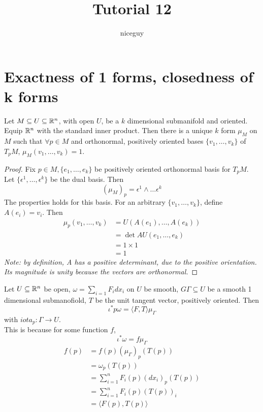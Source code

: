 \documentclass[12pt]{article}
\title{Tutorial 12}
\author{niceguy}
\begin{document}
\maketitle

\section{Exactness of 1 forms, closedness of k forms}

\begin{lem}
    Let $M \subseteq U \subseteq \mathbb{R}^n$, with open $U$, be a $k$ dimensional submanifold and oriented. Equip $\mathbb{R}^n$ with the standard inner product. Then there is a unique $k$ form $\mu_M$ on $M$ such that $\forall p \in M$ and orthonormal, positively oriented bases $\{v_1,\dots,v_k\}$ of $T_pM$, $\mu_M(v_1,\dots,v_k) = 1$.
\end{lem}

\begin{proof}
    Fix $p \in M, \{e_1,\dots,e_k\}$ be positively oriented orthonormal basis for $T_pM$. Let $\{\epsilon^1, \dots, \epsilon^k\}$ be the dual basis. Then
    $$(\mu_M)_p = \epsilon^1 \wedge \dots \epsilon^k$$
    The properties holds for this basis. For an arbitrary $\{v_1,\dots,v_k\}$, define $A(e_i) = v_i$. Then
    \begin{align*}
        \mu_p(v_1,\dots,v_k) &= U(A(e_1),\dots,A(e_k)) \\
                           &= \det A U(e_1,\dots,e_k) \\
                           &= 1 \times 1 \\
                           &= 1
    \end{align*}
    \textit{Note: by definition, A has a positive determinant, due to the positive orientation. Its magnitude is unity because the vectors are orthonormal.}
\end{proof}

Let $U \subseteq \mathbb{R}^n$ be open, $\omega = \sum_{i=1} F_i dx_i$ on $U$ be smooth, $G\Gamma \subseteq U$ be a smooth 1 dimensional submanofiold, $T$ be the unit tangent vector, positively oriented. Then
$$\iota^*p\omega = \langle F, T \rangle\mu_\Gamma$$
with $iota_p: \Gamma \rightarrow U$. \\

This is because for some function $f$,
$$\iota^*\omega = f\mu_\Gamma$$
\begin{align*}
    f(p) &= f(p) (\mu_\Gamma)_p(T(p)) \\
         &= \omega_p(T(p)) \\
         &= \sum_{i=1}^n F_i(p)(dx_i)_p(T(p)) \\
         &= \sum_{i=1}^n F_i(p) (T(p))_i \\
         &= \langle F(p), T(p) \rangle
\end{align*}
\end{document}
